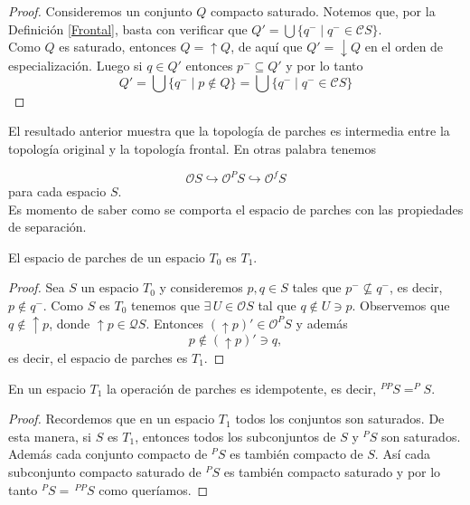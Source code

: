 \begin{proof}
    Consideremos un conjunto $Q$ compacto saturado. Notemos que, por la Definición \ref{Frontal}, basta con verificar que $Q'=\bigcup\{q^-\mid q^-\in \mathcal{C}S\}$.\\

    Como $Q$ es saturado, entonces $Q=\uparrow Q$, de aquí que $Q'=\downarrow Q$ en el orden de especialización. Luego si $q\in Q'$ entonces $p^-\subseteq Q'$ y por lo tanto 
    \[
    Q'=\bigcup\{q^-\mid p\notin Q\}=\bigcup\{q^-\mid q^-\in \mathcal{C}S\}
    \]
\end{proof}

El resultado anterior muestra que la topología de parches es intermedia entre la topología original y la topología frontal. En otras palabra tenemos 

\[
\mathcal{O}S \hookrightarrow \mathcal{O}^PS \hookrightarrow \mathcal{O}^fS
\]
para cada espacio $S$.\\

Es momento de saber como se comporta el espacio de parches con las propiedades de separación.

\begin{lem}\label{ParcheT1}
    El espacio de parches de un espacio $T_0$ es $T_1$.
\end{lem}

\begin{proof}
    Sea $S$ un espacio $T_0$ y consideremos $p, q\in S$ tales que $p^-\nsubseteq q^-$, es decir, $p\notin q^-$. Como $S$ es $T_0$ tenemos que $\exists \,U\in \mathcal{O}S$ tal que $q\notin U\ni p$. Observemos que $q\notin \uparrow p$, donde $\uparrow p\in \mathcal{Q}S$. Entonces $(\uparrow p)'\in \mathcal{O}^PS$ y además 
    \[
    p \notin (\uparrow p)'\ni q,
    \]
    es decir, el espacio de parches es $T_1$.
\end{proof}

\begin{lem}\label{Parcheidem}
    En un espacio $T_1$ la operación de parches es idempotente, es decir, $^{PP}S=^PS$.
\end{lem}

\begin{proof}
    Recordemos que en un espacio $T_1$ todos los conjuntos son saturados. De esta manera, si $S$ es $T_1$, entonces todos los subconjuntos de $S$ y $^PS$ son saturados. Además cada conjunto compacto de $^PS$ es también compacto de $S$. Así cada subconjunto compacto saturado de $^PS$ es también compacto saturado y por lo tanto $^PS=\,^{PP}S$ como queríamos.  
\end{proof}


